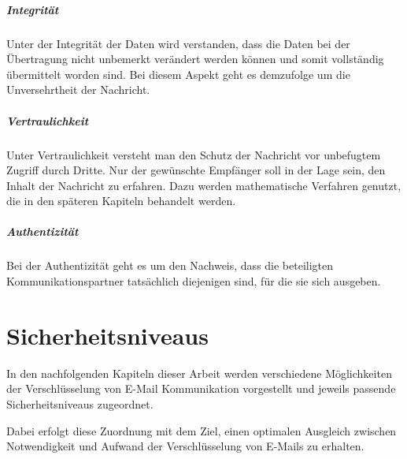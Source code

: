 \documentclass  [paper=a4,
				fontsize=12pt,
				listof=totoc,
				bibliography=totoc
				]{scrreprt}
\begin{document}
	\paragraph{Integrität}
	
	Unter der Integrität der Daten wird verstanden, dass die Daten bei der Übertragung nicht unbemerkt verändert werden können und somit vollständig übermittelt worden sind. Bei diesem Aspekt geht es demzufolge um die Unversehrtheit der Nachricht.
	
	\paragraph{Vertraulichkeit}
	
	Unter Vertraulichkeit versteht man den Schutz der Nachricht vor unbefugtem Zugriff durch Dritte. Nur der gewünschte Empfänger soll in der Lage sein, den Inhalt der Nachricht zu erfahren. Dazu werden mathematische Verfahren genutzt, die in den späteren Kapiteln behandelt werden.
	
	\paragraph{Authentizität}
	
	Bei der Authentizität geht es um den Nachweis, dass die beteiligten Kommunikationspartner tatsächlich diejenigen sind, für die sie sich ausgeben.
	
	\chapter{Sicherheitsniveaus}\label{chap:sicherheitsniveaus}
	
	
		In den nachfolgenden Kapiteln dieser Arbeit werden verschiedene Möglichkeiten der Verschlüsselung von E-Mail Kommunikation vorgestellt und jeweils passende Sicherheitsniveaus zugeordnet. %
		
		Dabei erfolgt diese Zuordnung mit dem Ziel, einen optimalen Ausgleich zwischen Notwendigkeit und Aufwand der Verschlüsselung von E-Mails zu erhalten.
		\medskip\\
		
\end{document}
